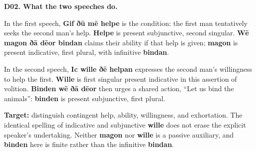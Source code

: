 \par\begin{minipage}{\linewidth}\raggedright
\textbf{D02. What the two speeches do.}

In the first speech, \textbf{Gif ðū mē helpe} is the condition: the first man tentatively seeks the second man’s help. \textbf{Helpe} is present subjunctive, second singular. \textbf{Wē magon ðā dēor bindan} claims their ability if that help is given; \textbf{magon} is present indicative, first plural, with infinitive \textbf{bindan}.

In the second speech, \textbf{Ic wille ðē helpan} expresses the second man’s willingness to help the first. \textbf{Wille} is first singular present indicative in this assertion of volition. \textbf{Binden wē ðā dēor} then urges a shared action, “Let us bind the animals”: \textbf{binden} is present subjunctive, first plural.

\textbf{Target:} distinguish contingent help, ability, willingness, and exhortation. The identical spelling of indicative and subjunctive \textbf{wille} does not erase the explicit speaker’s undertaking. Neither \textbf{magon} nor \textbf{wille} is a passive auxiliary, and \textbf{binden} here is finite rather than the infinitive \textbf{bindan}.

\end{minipage}\par\addvspace{4pt}

